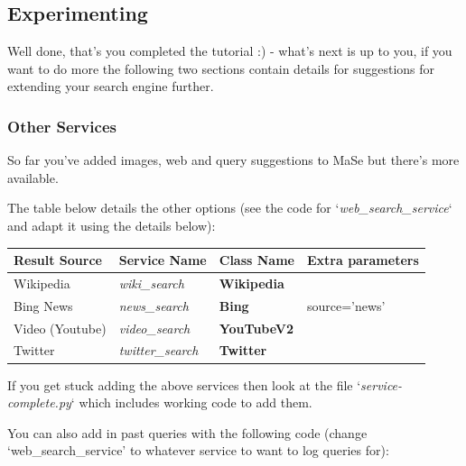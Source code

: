 \documentclass[letterpaper,10pt,english]{sphinxmanual}
\begin{document}
\subsection{Experimenting}
\label{mase-tutorial:experimenting}
Well done, that's you completed the tutorial :) - what's next is up to you, if you want to do more the following two sections contain details for suggestions for extending your search engine further.


\subsubsection{Other Services}
\label{mase-tutorial:other-services}
So far you've added images, web and query suggestions to MaSe but there's more available.

The table below details the other options (see the code for `\emph{web\_search\_service}` and adapt it using the details below):

\begin{tabulary}{\linewidth}{|L|L|L|L|}
\hline
\textbf{
Result Source
} & \textbf{
Service Name
} & \textbf{
Class Name
} & \textbf{
Extra parameters
}\\\hline

Wikipedia
 & 
\emph{wiki\_search}
 & 
\textbf{Wikipedia}
 & \\\hline

Bing News
 & 
\emph{news\_search}
 & 
\textbf{Bing}
 & 
source='news'
\\\hline

Video (Youtube)
 & 
\emph{video\_search}
 & 
\textbf{YouTubeV2}
 & \\\hline

Twitter
 & 
\emph{twitter\_search}
 & 
\textbf{Twitter}
 & \\\hline
\end{tabulary}


If you get stuck adding the above services then look at the file `\emph{service-complete.py}` which includes working code to add them.

You can also add in past queries with the following code (change `web\_search\_service' to whatever service to want to log queries for):
\end{document}
